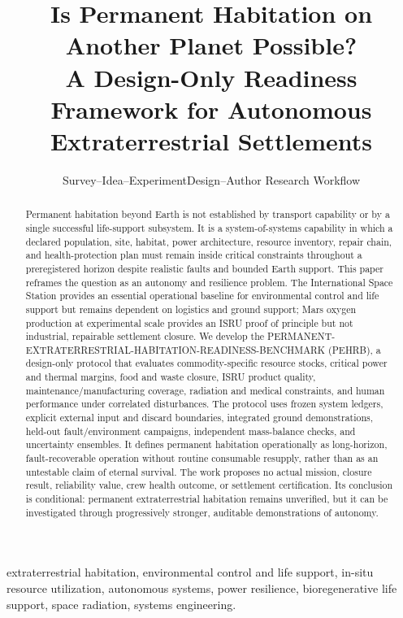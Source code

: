 \documentclass[10pt,conference]{IEEEtran}
\begin{document}
\title{Is Permanent Habitation on Another Planet Possible?\\
A Design-Only Readiness Framework for Autonomous Extraterrestrial Settlements}

\author{Survey--Idea--ExperimentDesign--Author Research Workflow}

\maketitle

\begin{abstract}
Permanent habitation beyond Earth is not established by transport capability or by a single successful life-support subsystem. It is a system-of-systems capability in which a declared population, site, habitat, power architecture, resource inventory, repair chain, and health-protection plan must remain inside critical constraints throughout a preregistered horizon despite realistic faults and bounded Earth support. This paper reframes the question as an autonomy and resilience problem. The International Space Station provides an essential operational baseline for environmental control and life support but remains dependent on logistics and ground support; Mars oxygen production at experimental scale provides an ISRU proof of principle but not industrial, repairable settlement closure. We develop the PERMANENT-EXTRATERRESTRIAL-HABITATION-READINESS-BENCHMARK (PEHRB), a design-only protocol that evaluates commodity-specific resource stocks, critical power and thermal margins, food and waste closure, ISRU product quality, maintenance/manufacturing coverage, radiation and medical constraints, and human performance under correlated disturbances. The protocol uses frozen system ledgers, explicit external input and discard boundaries, integrated ground demonstrations, held-out fault/environment campaigns, independent mass-balance checks, and uncertainty ensembles. It defines permanent habitation operationally as long-horizon, fault-recoverable operation without routine consumable resupply, rather than as an untestable claim of eternal survival. The work proposes no actual mission, closure result, reliability value, crew health outcome, or settlement certification. Its conclusion is conditional: permanent extraterrestrial habitation remains unverified, but it can be investigated through progressively stronger, auditable demonstrations of autonomy.
\end{abstract}

\begin{IEEEkeywords}
extraterrestrial habitation, environmental control and life support, in-situ resource utilization, autonomous systems, power resilience, bioregenerative life support, space radiation, systems engineering.
\end{IEEEkeywords}
\end{document}
